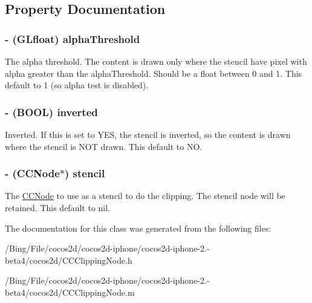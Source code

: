 \subsection{Property Documentation}
\hypertarget{interface_c_c_clipping_node_a94ce5211cf91e156a8c294291a81cf48}{
\subsubsection[{alpha\-Threshold}]{\setlength{\rightskip}{0pt plus 5cm}-\/ (G\-Lfloat) {\bf alpha\-Threshold}}}\label{interface_c_c_clipping_node_a94ce5211cf91e156a8c294291a81cf48}
The alpha threshold. The content is drawn only where the stencil have pixel with alpha greater than the alpha\-Threshold. Should be a float between 0 and 1. This default to 1 (so alpha test is disabled). \hypertarget{interface_c_c_clipping_node_a78d5892a56ab1d689412495ba1a3d0e9}{
\subsubsection[{inverted}]{\setlength{\rightskip}{0pt plus 5cm}-\/ (B\-O\-O\-L) {\bf inverted}}}\label{interface_c_c_clipping_node_a78d5892a56ab1d689412495ba1a3d0e9}
Inverted. If this is set to Y\-E\-S, the stencil is inverted, so the content is drawn where the stencil is N\-O\-T drawn. This default to N\-O. \hypertarget{interface_c_c_clipping_node_a59636e24024ad61ad41df1c2cc643452}{
\subsubsection[{stencil}]{\setlength{\rightskip}{0pt plus 5cm}-\/ ({\bf C\-C\-Node}$\ast$) {\bf stencil}}}\label{interface_c_c_clipping_node_a59636e24024ad61ad41df1c2cc643452}
The \hyperlink{class_c_c_node}{C\-C\-Node} to use as a stencil to do the clipping. The stencil node will be retained. This default to nil. 

The documentation for this class was generated from the following files\-:\begin{DoxyCompactItemize}
\item 
/\-Bing/\-File/cocos2d/cocos2d-\/iphone/cocos2d-\/iphone-\/2.-\/beta4/cocos2d/C\-C\-Clipping\-Node.\-h\item 
/\-Bing/\-File/cocos2d/cocos2d-\/iphone/cocos2d-\/iphone-\/2.-\/beta4/cocos2d/C\-C\-Clipping\-Node.\-m\end{DoxyCompactItemize}
